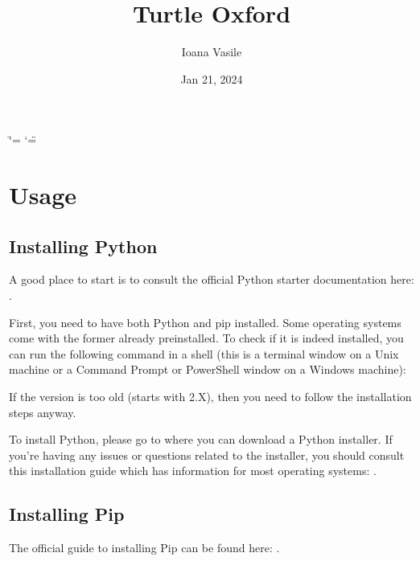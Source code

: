 \documentclass[letterpaper,10pt,english]{sphinxmanual}
\title{Turtle Oxford}
\date{Jan 21, 2024}
\author{Ioana Vasile}
\begin{document}
\ifdefined\shorthandoff
  \ifnum\catcode`\=\string=\active\shorthandoff{=}\fi
  \ifnum\catcode`\"=\active{}\fi
\fi

\pagestyle{empty}
\sphinxmaketitle
\pagestyle{plain}
\sphinxtableofcontents
\pagestyle{normal}
\label{\detokenize{index::doc}}


\sphinxstepscope


\chapter{Usage}
\label{\detokenize{usage:usage}}\label{\detokenize{usage::doc}}

\section{Installing Python}
\label{\detokenize{usage:installing-python}}
\sphinxAtStartPar
A good place to start is to consult the official Python starter documentation here: .

\sphinxAtStartPar
First, you need to have both Python and pip installed. Some operating systems come with the former already pre\sphinxhyphen{}installed. To check if it is indeed installed,
you can run the following command in a shell (this is a terminal window on a Unix machine or a Command Prompt or PowerShell window on a Windows machine):

\begin{sphinxVerbatim}[commandchars=\\\{\}]
 
\end{sphinxVerbatim}

\sphinxAtStartPar
If the version is too old (starts with 2.X), then you need to follow the installation steps anyway.

\sphinxAtStartPar
To install Python, please go to  where you can download a Python installer. If you’re having any issues or questions related to
the installer, you should consult this installation guide which has information for most operating systems: .


\section{Installing Pip}
\label{\detokenize{usage:installing-pip}}
\sphinxAtStartPar
The official guide to installing Pip can be found here: .
\end{document}
